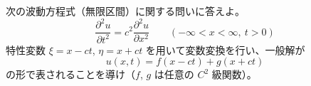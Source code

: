 
次の波動方程式（無限区間）に関する問いに答えよ。
\[
\frac{\partial^{2} u}{\partial t^{2}} = c^{2}\frac{\partial^{2} u}{\partial x^{2}} \qquad (-\infty < x < \infty,\ t > 0)
\]
特性変数 $\xi = x - ct$, $\eta = x + ct$ を用いて変数変換を行い、一般解が
\[
u(x,t) = f(x-ct) + g(x+ct)
\]
の形で表されることを導け（$f$, $g$ は任意の $C^{2}$ 級関数）。

